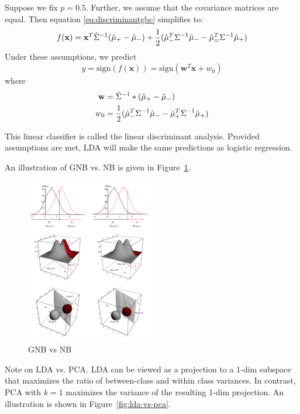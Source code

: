 \documentclass[a4paper,10pt,twoside]{article}
\begin{document}
Suppose we fix $p=0.5$. Further, we assume that the covariance matrices are equal. Then equation \ref{eq:discriminantgbc} simplifies to:
\begin{equation*}
  f(\mathbf{x})=\mathbf{x}^T\hat{\Sigma}^{-1}(\hat{\mu}_+-\hat{\mu}_-)+{1\over 2}(\hat{\mu}^T_-\Sigma^{-1}\hat{\mu}_--\hat{\mu}_=^{T}\Sigma^{-1}\hat{\mu}_+)
\end{equation*}
Under these assumptions, we predict
\begin{equation*}
  y = \text{sign}(f(\mathbf{x})) = \text{sign}(\mathbf{w}^T\mathbf{x}+w_0)
\end{equation*}
where
\begin{align*}
  \mathbf{w} &= \hat{\Sigma}^{-1}*(\hat{\mu}_+-\hat{\mu}_-)\\
  w_0 &= {1\over 2} (\hat{\mu}_-^T\Sigma^{-1}\hat{\mu}_- -\hat{\mu}_+^T\Sigma^{-1}\hat{\mu}_+)
\end{align*}

This linear classifier is called the linear discriminant analysis. Provided assumptions are met, LDA will make the same predictions as logistic regression.

An illustration of GNB vs. NB is given in Figure~\ref{fig:gnb_vs_nb}.

\begin{figure}
  \centering
  \includegraphics[width=0.5\textwidth]{figures/GNB_vs_NB.png}
  \caption{GNB vs NB}
  \label{fig:gnb_vs_nb}
\end{figure}

Note on LDA vs. PCA. LDA can be viewed as a projection to a 1-dim subspace that maximizes the ratio of between-class and within class variances. In contrast, PCA with $k=1$ maximizes the variance of the resulting 1-dim projection. An illustration is shown in Figure~\ref{fig:lda-vs-pca}.
\end{document}
